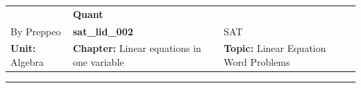 \documentclass[11pt,paper=a4,answers]{exam}
\begin{document}
\begin{center}
    \centering
    \renewcommand{\arraystretch}{1.5}
    \begin{tabularx}{\textwidth}{YYY}
    & \normalsize\bf{{\Large{{Quant}}}} & \\
    By Preppeo & \normalsize\bf{{sat\_lid\_002}} & SAT\\ 
    \normalsize{{\textbf{{Unit:}} Algebra}} & \normalsize{{\textbf{{Chapter:}} Linear equations in one variable}} & \normalsize{{\textbf{{Topic:}} Linear Equation Word Problems}} \\
    \end{tabularx}
\end{center}
\par\noindent\rule{\textwidth}{1pt}
\end{document}

